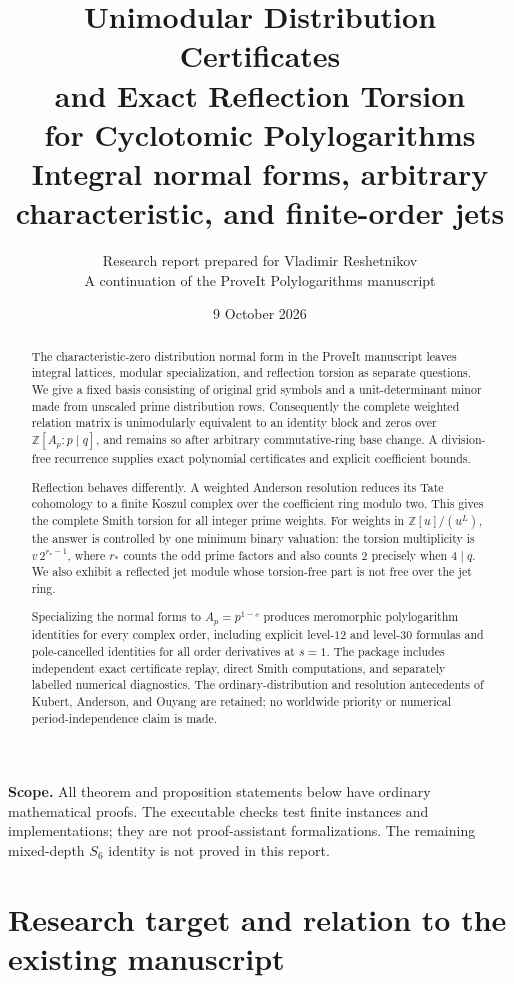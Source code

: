 \documentclass[11pt]{article}
\title{\textbf{Unimodular Distribution Certificates\\and Exact Reflection Torsion\\for Cyclotomic Polylogarithms}\\[6pt]
\large Integral normal forms, arbitrary characteristic, and finite-order jets}
\author{Research report prepared for Vladimir Reshetnikov\\\small A continuation of the ProveIt Polylogarithms manuscript}
\date{9 October 2026}
\numberwithin{equation}{section}
\theoremstyle{definition}
\theoremstyle{remark}
\newcommand{\Z}{\mathbb Z}
\begin{document}
\maketitle
\begin{abstract}
The characteristic-zero distribution normal form in the ProveIt manuscript
leaves integral lattices, modular specialization, and reflection torsion as
separate questions. We give a fixed basis consisting of original grid
symbols and a unit-determinant minor made from unscaled prime distribution
rows. Consequently the complete weighted relation matrix is unimodularly
equivalent to an identity block and zeros over
$\Z[A_p:p\mid q]$, and remains so after arbitrary commutative-ring base
change. A division-free recurrence supplies exact polynomial certificates
and explicit coefficient bounds.

Reflection behaves differently. A weighted Anderson resolution reduces
its Tate cohomology to a finite Koszul complex over the coefficient ring
modulo two. This gives the complete Smith torsion for all integer prime
weights. For weights in $\Z[u]/(u^L)$, the answer is controlled by one
minimum binary valuation: the torsion multiplicity is
$v\,2^{r_*-1}$, where $r_*$ counts the odd prime factors and also counts
$2$ precisely when $4\mid q$. We also exhibit a reflected jet module whose
torsion-free part is not free over the jet ring.

Specializing the normal forms to $A_p=p^{1-s}$ produces meromorphic
polylogarithm identities for every complex order, including explicit
level-$12$ and level-$30$ formulas and pole-cancelled identities for all
order derivatives at $s=1$. The package includes independent exact
certificate replay, direct Smith computations, and separately labelled
numerical diagnostics. The ordinary-distribution and resolution
antecedents of Kubert, Anderson, and Ouyang are retained; no worldwide
priority or numerical period-independence claim is made.
\end{abstract}
\vspace{5pt}
\noindent\textbf{Scope.} All theorem and proposition statements below have
ordinary mathematical proofs. The executable checks test finite instances
and implementations; they are not proof-assistant formalizations. The
remaining mixed-depth $S_6$ identity is not proved in this report.
\clearpage
\tableofcontents
\clearpage

\section{Research target and relation to the existing manuscript}
\label{sec:scope}
\end{document}
